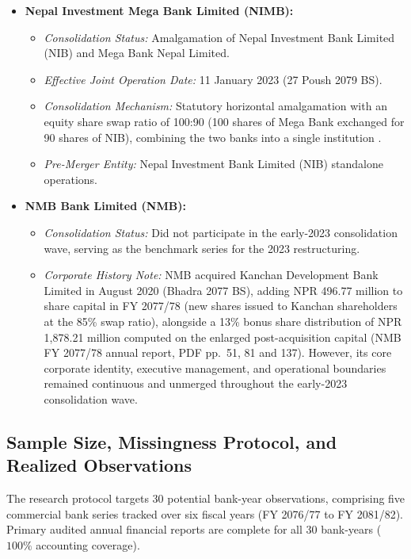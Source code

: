 \begin{itemize}
    \item \textbf{Nepal Investment Mega Bank Limited (NIMB):}
    \begin{itemize}
        \item \textit{Consolidation Status:} Amalgamation of Nepal Investment Bank Limited (NIB) and Mega Bank Nepal Limited.
        \item \textit{Effective Joint Operation Date:} 11 January 2023 (27 Poush 2079 BS).
        \item \textit{Consolidation Mechanism:} Statutory horizontal amalgamation with an equity share swap ratio of 100:90 (100 shares of Mega Bank exchanged for 90 shares of NIB), combining the two banks into a single institution \citep{nimb2023report}.
        \item \textit{Pre-Merger Entity:} Nepal Investment Bank Limited (NIB) standalone operations.
    \end{itemize}

    \item \textbf{NMB Bank Limited (NMB):}
    \begin{itemize}
        \item \textit{Consolidation Status:} Did not participate in the early-2023 consolidation wave, serving as the benchmark series for the 2023 restructuring.
        \item \textit{Corporate History Note:} NMB acquired Kanchan Development Bank Limited in August 2020 (Bhadra 2077 BS), adding NPR 496.77 million to share capital in FY 2077/78 (new shares issued to Kanchan shareholders at the 85\% swap ratio), alongside a 13\% bonus share distribution of NPR 1,878.21 million computed on the enlarged post-acquisition capital \citep{nmb2021report} (NMB FY 2077/78 annual report, PDF pp.~51, 81 and 137). However, its core corporate identity, executive management, and operational boundaries remained continuous and unmerged throughout the early-2023 consolidation wave.
    \end{itemize}
\end{itemize}

\subsection{Sample Size, Missingness Protocol, and Realized Observations}
\label{subsec:sample_realized}
The research protocol targets 30 potential bank-year observations, comprising five commercial bank series tracked over six fiscal years (FY 2076/77 to FY 2081/82). Primary audited annual financial reports are complete for all 30 bank-years ($100\%$ accounting coverage).

